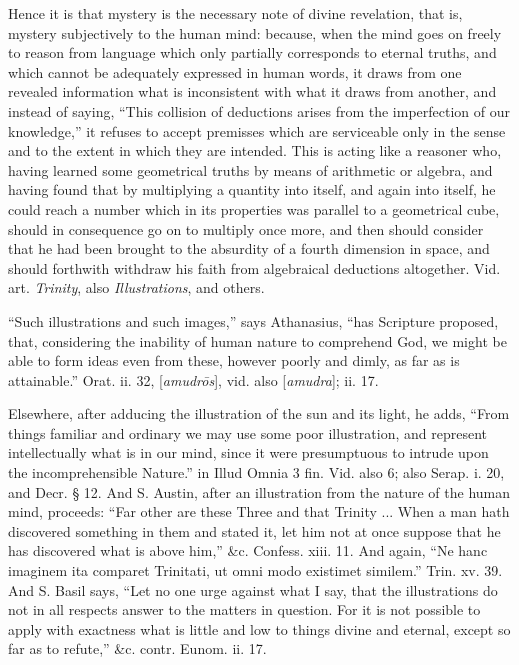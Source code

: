 Hence it is that mystery is the necessary note of
divine revelation, that is, mystery subjectively to the human mind:
because, when the mind goes on freely to reason from language which
only partially corresponds to eternal truths, and which cannot be
adequately expressed in human words, it draws from one revealed
information what is inconsistent with what it draws from another, and
instead of saying, ``This collision of deductions arises from the
imperfection of our knowledge,'' it refuses to accept premisses which
are serviceable only in the sense and to the extent in which they are
intended. This is acting like a reasoner who, having learned some
geometrical truths by means of arithmetic or algebra, and having found
that by multiplying a quantity into itself, and again into itself, he
could reach a number which in its properties was parallel to a
geometrical cube, should in consequence go on to multiply once more,
and then should consider that he had been brought to the absurdity of
a fourth dimension in space, and should forthwith withdraw his faith
from algebraical deductions altogether. Vid. art. \emph{Trinity},
also \emph{Illustrations},
and others.

``Such illustrations and such images,'' says
Athanasius, ``has Scripture proposed, that, considering the inability
of human nature to comprehend God, we might be able to form ideas even
from these, however poorly and dimly, as far as is attainable.'' Orat.
ii. 32, [\emph{amudr\={o}s}], vid. also [\emph{amudra}]; ii. 17.

Elsewhere, after adducing the illustration of the
sun and its light, he adds, ``From things familiar and ordinary we may
use some poor illustration, and represent intellectually what is in
our mind, since it were presumptuous to intrude upon the
incomprehensible Nature.'' in Illud Omnia 3 fin. Vid. also 6; also
Serap. i. 20, and Decr. § 12. And S. Austin, after an illustration from the nature of the human mind, proceeds: ``Far other
are these Three and that Trinity ... When a man hath discovered
something in them and stated it, let him not at once suppose that he
has discovered what is above him,'' \&c. Confess. xiii. 11. And
again, ``Ne hanc imaginem ita comparet Trinitati, ut omni modo
existimet similem.'' Trin. xv. 39. And S. Basil says, ``Let no one urge
against what I say, that the illustrations do not in all respects
answer to the matters in question. For it is not possible to apply
with exactness what is little and low to things divine and eternal,
except so far as to refute,'' \&c. contr. Eunom. ii. 17.

